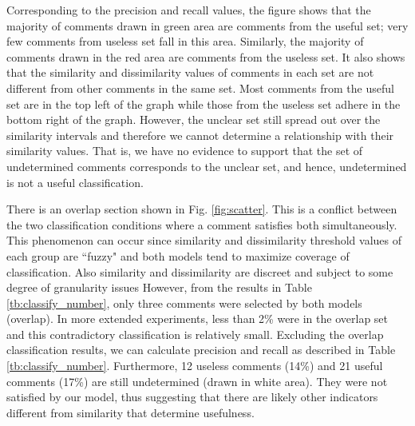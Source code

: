 Corresponding to the precision and recall values, the figure shows that the majority of comments drawn in green area are comments from the useful set; very few comments from useless set fall in this area.
Similarly, the majority of comments drawn in the red area are comments from the useless set.
It also shows that the similarity and dissimilarity values of comments in each set are not different from other comments in the same set.
Most comments from the useful set are in the top left of the graph
while those from the useless set adhere in the bottom right of the graph.
However, the unclear set still spread out over the similarity intervals and therefore we cannot determine  a relationship with their similarity values.
That is, we have no evidence to support that the set of undetermined comments corresponds to the unclear set, and hence,	 undetermined is not a useful classification.

There is an overlap section shown in Fig. \ref{fig:scatter}.
This is a conflict between the two classification conditions where a comment satisfies both simultaneously.  
This phenomenon can occur since similarity and dissimilarity threshold values of each group are ``fuzzy" and both models tend to maximize coverage of classification. Also similarity and dissimilarity are discreet and subject to some degree of granularity issues 
However, from the results in Table \ref{tb:classify_number}, only three comments were selected by both models (overlap).
In more extended experiments, less than 2\% were in the overlap set and this contradictory classification is relatively small.
Excluding the overlap classification results, we can calculate precision and recall as described in Table \ref{tb:classify_number}. Furthermore, 12 useless comments (14\%) and 21 useful comments (17\%) are still undetermined (drawn in white area). They were not satisfied by our model, thus suggesting that there are likely other indicators different from similarity that determine usefulness.


